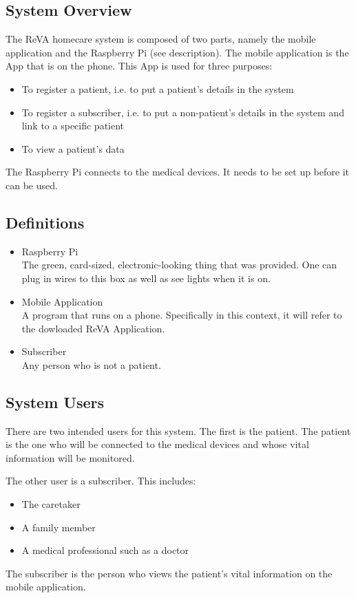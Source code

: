 \subsection{System Overview}
The ReVA homecare system is composed of two parts, namely the mobile application and the Raspberry Pi (see description). The mobile application is the App that is on the phone. This App is used for three purposes:
\begin{itemize}
	\item To register a patient, i.e. to put a patient's details in the system
	\item To register a subscriber, i.e. to put a non-patient's details in the system and link to a specific patient
	\item To view a patient's data
\end{itemize}
The Raspberry Pi connects to the medical devices. It needs to be set up before it can be used.
\subsection{Definitions}
\begin{itemize}
	\item Raspberry Pi\\
	The green, card-sized, electronic-looking thing that was provided. One can plug in wires to this box as well as see lights when it is on.
	
	\item Mobile Application\\
	A program that runs on a phone. Specifically in this context, it will refer to the dowloaded ReVA Application.
	
	\item Subscriber\\
	Any person who is not a patient.

\end{itemize}
\subsection{System Users}
There are two intended users for this system. The first is the patient. The patient is the one who will be connected to the medical devices and whose vital information will be monitored.

The other user is a subscriber. This includes:
\begin{itemize}
	\item The caretaker
	\item A family member
	\item A medical professional such as a doctor
\end{itemize}
The subscriber is the person who views the patient's vital information on the mobile application.